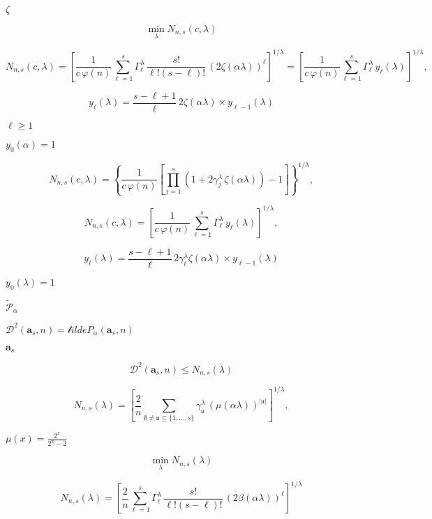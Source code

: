 \documentclass{article}
\begin{document}
$\zeta$
\pagebreak

\[   \min_\lambda N_{n,s}(c, \lambda)
\]
\pagebreak

\[   N_{n,s}(c, \lambda) =
   \left[
      \frac{1}{c \, \varphi(n)}
      \sum_{\ell=1}^s \Gamma_\ell^\lambda \, \frac{s!}{\ell! (s-\ell)!}
      \,
      \left( 2 \zeta(\alpha\lambda) \right)^\ell
   \right]^{1/\lambda}
   =
   \left[
      \frac{1}{c \, \varphi(n)}
      \sum_{\ell=1}^s \Gamma_\ell^\lambda \, y_\ell(\lambda)
   \right]^{1/\lambda},
\]
\pagebreak

\[   y_\ell(\lambda) = \frac{s - \ell + 1}{\ell}
   \, 2 \zeta(\alpha\lambda)
   \times y_{\ell - 1}(\lambda)
\]
\pagebreak

$\ell \geq 1$
\pagebreak

$y_0(\alpha) = 1$
\pagebreak

\[   N_{n,s}(c, \lambda) =
   \left\{
      \frac{1}{c \, \varphi(n)}
      \left[
        \prod_{j=1}^s
        \left( 1 + 2 \gamma_j^\lambda \, \zeta(\alpha\lambda) \right)
        - 1
      \right]
   \right\}^{1/\lambda},
\]
\pagebreak

\[   N_{n,s}(c, \lambda) =
   \left[
      \frac{1}{c \, \varphi(n)}
      \sum_{\ell=1}^s \Gamma_\ell^\lambda \, y_\ell(\lambda)
   \right]^{1/\lambda},
\]
\pagebreak

\[   y_\ell(\lambda) = \frac{s - \ell + 1}{\ell}
   \, 2 \gamma_\ell^\lambda \zeta(\alpha\lambda)
   \times y_{\ell - 1}(\lambda)
\]
\pagebreak

$y_0(\lambda) = 1$
\pagebreak

$\mathcal \tilde{P}_\alpha$
\pagebreak

$\mathcal D^2(\boldsymbol a_s, n)
= \mathcal tilde{P}_\alpha(\boldsymbol a_s, n)$
\pagebreak

$\boldsymbol a_s$
\pagebreak

\[   \mathcal D^2(\boldsymbol a_s, n) \leq N_{n,s}(\lambda)
\]
\pagebreak

\[   N_{n,s}(\lambda) =
   \left[
      \frac{2}{n}
      \sum_{\emptyset \neq \mathfrak u \subseteq \{1,\dots,s\}}
      \gamma_{\mathfrak u}^\lambda \,
      \left( \mu(\alpha\lambda) \right)^{|\mathfrak u|}
   \right]^{1/\lambda},
\]
\pagebreak

$\mu(x) = \frac{2^x}{2^x - 2} $
\pagebreak

\[   \min_\lambda N_{n,s}(\lambda)
\]
\pagebreak

\[   N_{n,s}(\lambda) =
   \left[
      \frac{2}{n}
      \sum_{\ell=1}^s \Gamma_\ell^\lambda \, \frac{s!}{\ell! (s-\ell)!}
      \,
      \left( 2 \beta(\alpha\lambda) \right)^\ell
   \right]^{1/\lambda}
\]
\pagebreak
\end{document}
